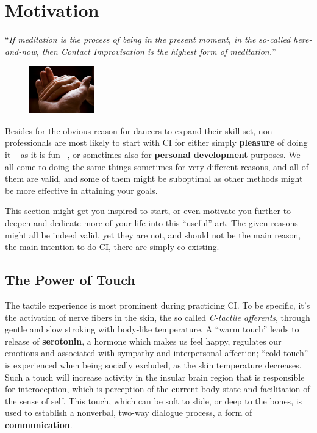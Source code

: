 \section{Motivation}\label{sec:motivation}

\begin{displayquote}
    ``\textit{If meditation is the process of being in the present moment, in the so-called here-and-now, then Contact Improvisation is the highest form of meditation.}''
\end{displayquote}

\begin{figure}
    \centering
    \includegraphics[width=0.25\textwidth]{images/motivation}
\end{figure}

Besides for the obvious reason for dancers to expand their skill-set, non-professionals are most likely to start with CI for either simply \textbf{pleasure} of doing it -- as it is fun --, or sometimes also for \textbf{personal development} purposes.
We all come to doing the same things sometimes for very different reasons, and all of them are valid, and some of them might be suboptimal as other methods might be more effective in attaining your goals.

This section might get you inspired to start, or even motivate you further to deepen and dedicate more of your life into this ``useful'' art.
The given reasons might all be indeed valid, yet they are not, and should not be the main reason, the main intention to do CI, there are simply co-existing.

\subsection{The Power of Touch}\label{subsec:the-power-of-touch}

The tactile experience is most prominent during practicing CI. To be specific, it's the activation of nerve fibers in the skin, the so called \textit{C-tactile afferents}, through gentle and slow stroking with body-like temperature.
A ``warm touch'' leads to release of \textbf{serotonin}, a hormone which makes us feel happy, regulates our emotions and associated with sympathy and interpersonal affection; ``cold touch'' is experienced when being socially excluded, as the skin temperature decreases.
Such a touch will increase activity in the insular brain region that is responsible for interoception, which is perception of the current body state and facilitation of the sense of self.
This touch, which can be soft to slide, or deep to the bones, is used to establish a nonverbal, two-way dialogue process, a form of \textbf{communication}.

